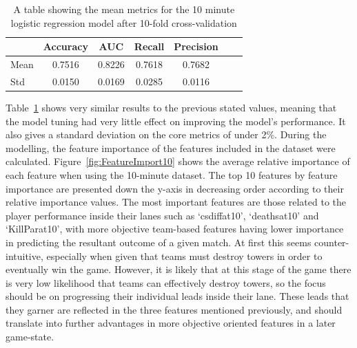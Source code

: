 \begin{table}[h]
    \centering
    \caption{A table showing the mean metrics for the 10 minute logistic regression model after 10-fold cross-validation}
    \begin{tabular}{lcccccc}
        \toprule
        \textbf{} & \textbf{Accuracy} & \textbf{AUC} & \textbf{Recall} & \textbf{Precision} \\
        \midrule
        Mean & 0.7516 & 0.8226 & 0.7618 & 0.7682 \\
        Std & 0.0150 & 0.0169 & 0.0285 & 0.0116 \\
        \bottomrule
    \end{tabular}
    \label{tab:Kfold10}
\end{table}

Table~\ref{tab:Kfold10} shows very similar results to the previous stated values, meaning that the model tuning had very little effect on improving the model's performance.
It also gives a standard deviation on the core metrics of under 2\%.
During the modelling, the feature importance of the features included in the dataset were calculated.
Figure~\ref{fig:FeatureImport10} shows the average relative importance of each feature when using the 10-minute dataset.
The top 10 features by feature importance are presented down the y-axis in decreasing order according to their relative importance values.
The most important features are those related to the player performance inside their lanes such as `csdiffat10', `deathsat10' and `KillParat10', with more objective team-based features having lower importance in predicting the resultant outcome of a given match.
At first this seems counter-intuitive, especially when given that teams must destroy towers in order to eventually win the game.
However, it is likely that at this stage of the game there is very low likelihood that teams can effectively destroy towers, so the focus should be on progressing their individual leads inside their lane.
These leads that they garner are reflected in the three features mentioned previously, and should translate into further advantages in more objective oriented features in a later game-state. \\

